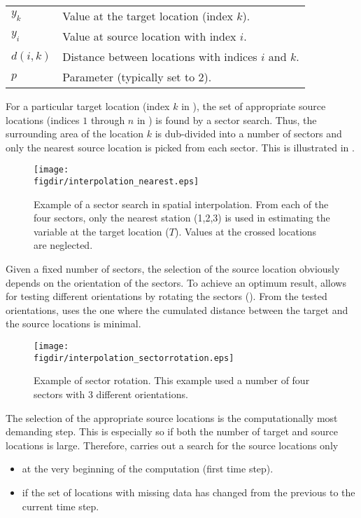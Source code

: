 \begin{tabular}{lp{}}
  $y_k$ & Value at the target location (index $k$). \\
  $y_i$ & Value at source location with index $i$. \\
  $d(i,k)$ & Distance between locations with indices $i$ and $k$. \\
  $p$ & Parameter (typically set to 2). \\
\end{tabular}

\medskip
For a particular target location (index $k$ in ), the set of appropriate source locations (indices $1$ through $n$ in ) is found by a sector search. Thus, the surrounding area of the location $k$ is dub-divided into a number of sectors and only the nearest source location is picked from each sector. This is illustrated in .

\begin{figure}
  \centering
  \texttt{[image: \\figdir/interpolation\_nearest.eps]}
  \caption[Example of a sector search in spatial interpolation.]{Example of a sector search in spatial interpolation. From each of the four sectors, only the nearest station (1,2,3) is used in estimating the variable at the target location ($T$). Values at the crossed locations are neglected. \label{fig:meteofill:nearest}}
\end{figure}

Given a fixed number of sectors, the selection of the source location obviously depends on the orientation of the sectors. To achieve an optimum result,  allows for testing different orientations by rotating the sectors (). From the tested orientations,  uses the one where the cumulated distance between the target and the source locations is minimal.

\begin{figure}
  \centering
  \texttt{[image: \\figdir/interpolation\_sectorrotation.eps]}
  \caption[Example of sector rotation.]{Example of sector rotation. This example used a number of four sectors with 3 different orientations.  \label{fig:meteofill:rotation}}
\end{figure}

The selection of the appropriate source locations is the computationally most demanding step. This is especially so if both the number of target and source locations is large. Therefore,  carries out a search for the source locations only
\begin{itemize}
  \item at the very beginning of the computation (first time step).
  \item if the set of locations with missing data has changed from the previous to the current time step.
\end{itemize}

